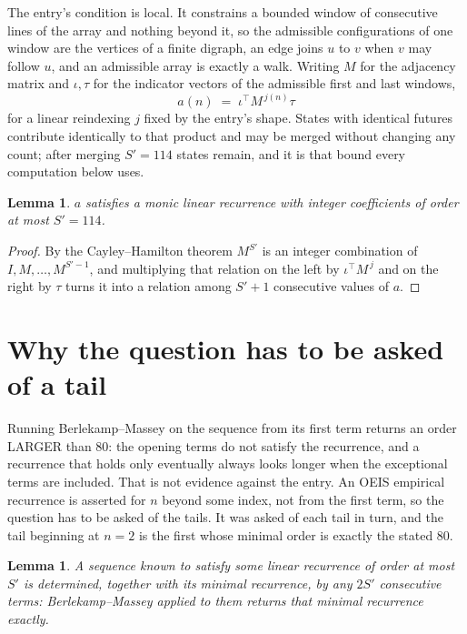 \documentclass[11pt,a4paper]{article}
\theoremstyle{plain}
\newtheorem{lemma}[theorem]{Lemma}
\theoremstyle{definition}
\begin{document}
The entry's condition is local. It constrains a bounded window of consecutive lines of the
array and nothing beyond it, so the admissible configurations of one window are the vertices of
a finite digraph, an edge joins $u$ to $v$ when $v$ may follow $u$, and an admissible array is
exactly a walk. Writing $M$ for the adjacency matrix and $\iota,\tau$ for the indicator vectors
of the admissible first and last windows,
\[
a(n)\;=\;\iota^{\!\top}M^{\,j(n)}\tau
\]
for a linear reindexing $j$ fixed by the entry's shape. States with identical futures
contribute identically to that product and may be merged without changing any count; after
merging $S'=114$ states remain, and it is that bound every computation below uses.

\begin{lemma}\label{lem:cf}
$a$ satisfies a monic linear recurrence with integer coefficients of order at most $S'=114$.
\end{lemma}

\begin{proof}
By the Cayley--Hamilton theorem $M^{S'}$ is an integer combination of $I,M,\dots,M^{S'-1}$,
and multiplying that relation on the left by $\iota^{\!\top}M^{\,j}$ and on the right by
$\tau$ turns it into a relation among $S'+1$ consecutive values of $a$.
\end{proof}

\section{Why the question has to be asked of a tail}

Running Berlekamp--Massey on the sequence from its first term returns an order LARGER than $80$: the opening terms do not satisfy the recurrence, and a recurrence that holds only eventually always looks longer when the exceptional terms are included. That is not evidence against the entry. An OEIS empirical recurrence is asserted for $n$ beyond some index, not from the first term, so the question has to be asked of the tails. It was asked of each tail in turn, and the tail beginning at $n=2$ is the first whose minimal order is exactly the stated $80$.

\begin{lemma}\label{lem:bm}
A sequence known to satisfy some linear recurrence of order at most $S'$ is determined,
together with its minimal recurrence, by any $2S'$ consecutive terms: Berlekamp--Massey applied
to them returns that minimal recurrence exactly.
\end{lemma}
\end{document}
